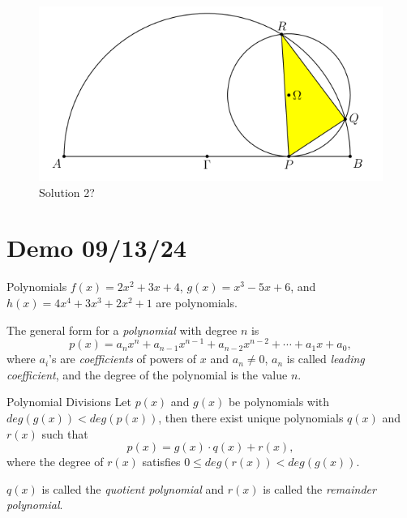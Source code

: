 \documentclass[professionalfont, 12pt, handout, t]{beamer} %
\theoremstyle{plain}
\theoremstyle{definition}
\begin{document}
\begin{frame}{}
    \begin{figure}[h]
        \centering
        \includegraphics[scale=0.5]{Geometry.PNG}
        \captionsetup{labelformat=empty}
        \caption{Solution 2?}
    \end{figure}
\end{frame}

\section{Demo 09/13/24}

\begin{frame}{Polynomials}
    $f(x) = 2x^2+3x+4$, $g(x) = x^3-5x+6$, and $h(x) = 4x^4+3x^3+2x^2+1$ are polynomials.\pause

    The general form for a \emph{polynomial} with degree $n$ is
    \[
        p(x) = a_nx^n+a_{n-1}x^{n-1}+a_{n-2}x^{n-2} + \cdots + a_1x+a_0,
    \]
    where $a_i$'s are \emph{coefficients} of powers of $x$ and $a_n \neq 0$, $a_n$ is called \emph{leading coefficient}, and the degree of the polynomial is the value $n$.
\end{frame}

\begin{frame}{Polynomial Divisions}
    Let $p(x)$ and $g(x)$ be polynomials with $deg(g(x)) < deg(p(x))$, then there exist unique polynomials $q(x)$ and $r(x)$ such that
    \[
        p(x) = g(x) \cdot q(x) + r(x),
    \]
    where the degree of $r(x)$ satisfies $0 \leq deg(r(x)) < deg(g(x))$.\pause

    $q(x)$ is called the \emph{quotient polynomial} and $r(x)$ is called the \emph{remainder polynomial}.

\end{frame}
\end{document}
